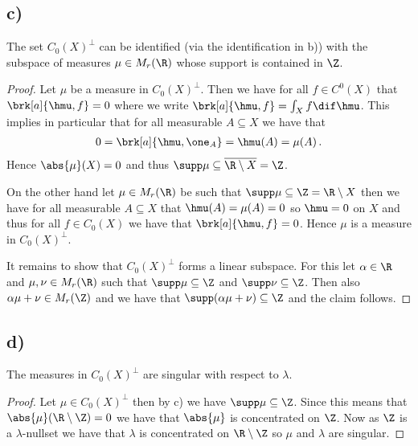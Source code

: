 \subsection{c)}
\begin{claim}
The set $C_0(X)^\perp$ can be identified (via the identification in b)) with the subspace of measures $\mu\in M_r(\R)$ whose support is contained in $\Z$.
\end{claim}
\begin{proof}
Let $\mu$ be a measure in $C_0(X)^\perp$. Then we have for all $f\in C^0(X)$ that $\brk[a]{\hmu,f}=0$ where we write $\brk[a]{\hmu,f}=\int_Xf\dif\hmu$. This implies in particular that for all measurable $A\subseteq X$ we have that
\begin{align*}
	0=\brk[a]{\hmu,\one_A}=\hmu(A)=\mu(A)\,.
\end{align*}
Hence $\abs{\mu}(X)=0$ and thus $\supp\mu\subseteq\overline{\R\setminus X}=\Z$.

On the other hand let $\mu\in M_r(\R)$ be such that $\supp\mu\subseteq\Z=\R\setminus X$ then we have for all measurable $A\subseteq X$ that $\hmu(A)=\mu(A)=0$ so $\hmu=0$ on $X$ and thus for all $f\in C_0(X)$ we have that $\brk[a]{\hmu,f}=0$. Hence $\mu$ is a measure in $C_0(X)^\perp$.

It remains to show that $C_0(X)^\perp$ forms a linear subspace. For this let $\alpha\in\R$ and $\mu,\nu\in M_r(\R)$ such that $\supp\mu\subseteq\Z$ and $\supp\nu\subseteq\Z$. Then also $\alpha\mu+\nu\in M_r(\Z)$ and we have that $\supp(\alpha\mu+\nu)\subseteq\Z$ and the claim follows.
\end{proof}

\subsection{d)}
\begin{claim}
The measures in $C_0(X)^\perp$ are singular with respect to $\lambda$.
\end{claim}
\begin{proof}
Let $\mu\in C_0(X)^\perp$ then by c) we have $\supp\mu\subseteq\Z$. Since this means that $\abs{\mu}(\R\setminus\Z)=0$ we have that $\abs{\mu}$ is concentrated on $\Z$. Now as $\Z$ is a $\lambda$-nullset we have that $\lambda$ is concentrated on $\R\setminus\Z$ so $\mu$ and $\lambda$ are singular.
\end{proof}

